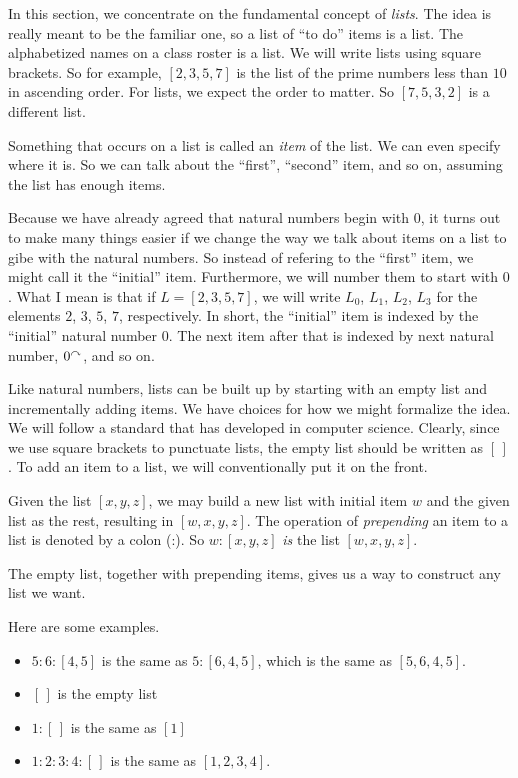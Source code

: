 In this section, we concentrate on the fundamental concept of \emph{lists}. The idea is really meant to
be the familiar one, so a list of ``to do'' items is a list. The alphabetized names on a class roster is a list. 
We will write lists using square brackets. So for example, $[2,3,5,7]$ is the list of 
the prime numbers less than $10$ in ascending order. For lists, we expect the order to matter. 
So $[7,5,3,2]$ is a different list.

Something that occurs on a list is called an \emph{item} of the list. We can even
specify where it is. So we can talk about the ``first'', ``second'' item, and so on, 
assuming the list has enough items. 

Because we have already agreed that natural numbers begin with $0$, it turns out to make
many things easier if we change the way we talk about items on a list to gibe with the natural
numbers. So instead of refering to the ``first'' item, we might call it the ``initial'' item.
Furthermore, we will number them to start with $0$. What I mean is that if $L=[2,3,5,7]$,
we will write $L_0$, $L_1$, $L_2$, $L_3$ for the elements $2$, $3$, $5$, $7$, respectively. 
In short, the ``initial'' item is indexed by the ``initial'' natural number $0$. The next item after that is indexed by next natural number, $0^\curvearrowright$,
and so on.

Like natural numbers, lists can be built up by starting with an empty list and incrementally adding items. We have choices 
for how we might formalize the idea. We will follow a standard that has developed in computer science. Clearly, since we use 
square brackets to punctuate lists, the empty list should be written as $[\,]$. To add an item to a list, we will conventionally
put it on the front.  

Given the list $[x,y,z]$, we may build a new list with initial item $w$ and the given list as the rest, resulting in $[w,x,y,z]$.
The operation of \emph{prepending} an item to a list is denoted by a colon (:). 
So $w:[x,y,z]$ \emph{is} the list $[w,x,y,z]$.

The empty list, together with prepending items, gives us a way to construct any list we want.

\ipadbreak

\begin{example}
  Here are some examples.
  \begin{itemize}
  \item $5:6:[4,5]$ is the same as $5:[6,4,5]$, which is the same as
    $[5,6,4,5]$.
  \item $[\,]$ is the empty list
  \item $1:[\,]$ is the same as $[1]$
  \item $1:2:3:4:[\,]$ is the same as $[1,2,3,4]$.
  \end{itemize}
\end{example}

